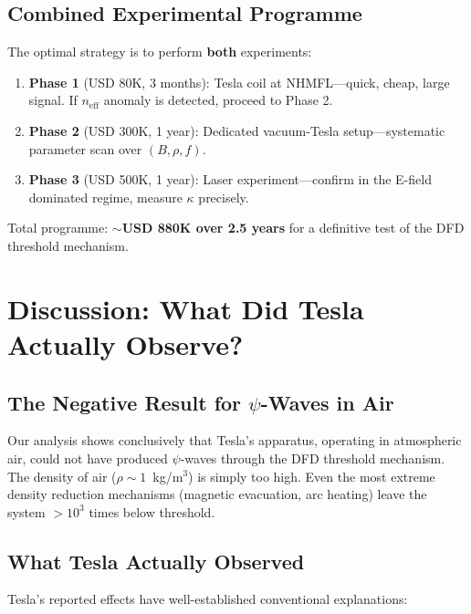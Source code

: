 \documentclass[11pt,a4paper]{article}
\begin{document}
\subsection{Combined Experimental Programme}

The optimal strategy is to perform \textbf{both} experiments:
\begin{enumerate}
\item \textbf{Phase 1} (USD 80K, 3 months): Tesla coil at NHMFL---quick, cheap, large signal.
  If $n_{\mathrm{eff}}$ anomaly is detected, proceed to Phase 2.
\item \textbf{Phase 2} (USD 300K, 1 year): Dedicated vacuum-Tesla setup---systematic
  parameter scan over $(B, \rho, f)$.
\item \textbf{Phase 3} (USD 500K, 1 year): Laser experiment---confirm in the E-field
  dominated regime, measure $\kappa$ precisely.
\end{enumerate}

Total programme: $\sim$\textbf{USD 880K over 2.5 years} for a definitive test of the
DFD threshold mechanism.

\section{Discussion: What Did Tesla Actually Observe?}\label{sec:discussion}

\subsection{The Negative Result for $\psi$-Waves in Air}

Our analysis shows conclusively that Tesla's apparatus, operating in atmospheric
air, could not have produced $\psi$-waves through the DFD threshold mechanism.
The density of air ($\rho \sim 1$~kg/m$^3$) is simply too high. Even the
most extreme density reduction mechanisms (magnetic evacuation, arc heating)
leave the system $>10^3$ times below threshold.

\subsection{What Tesla Actually Observed}

Tesla's reported effects have well-established conventional explanations:
\end{document}
